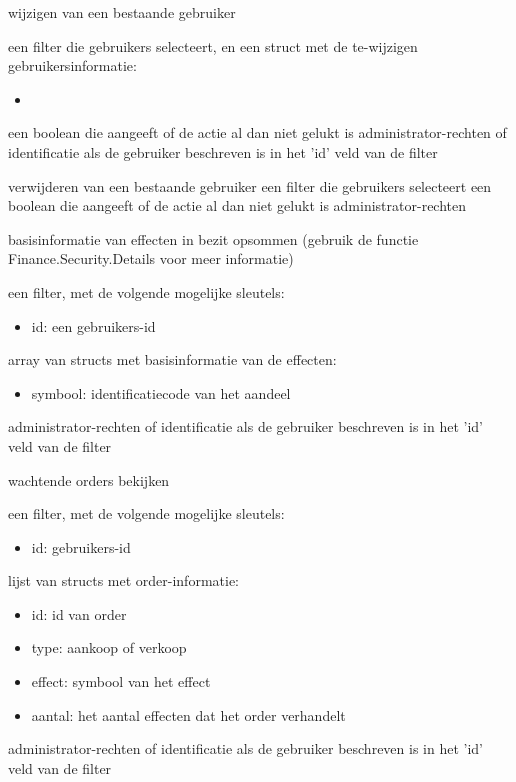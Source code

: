 	{ wijzigen van een bestaande gebruiker }
	{ een filter die gebruikers selecteert, en een struct met de te-wijzigen gebruikersinformatie:
		\begin{itemize}
		\item{}
		\end{itemize} }
	{ een boolean die aangeeft of de actie al dan niet gelukt is }
	{ administrator-rechten of identificatie als de gebruiker beschreven is in het 'id' veld van de filter }

	{ verwijderen van een bestaande gebruiker }
	{ een filter die gebruikers selecteert }
	{ een boolean die aangeeft of de actie al dan niet gelukt is }
	{ administrator-rechten }

	{ basisinformatie van effecten in bezit opsommen (gebruik de functie Finance.Security.Details voor meer informatie) }
	{ een filter, met de volgende mogelijke sleutels:
		\begin{itemize}
		\item{id: een gebruikers-id}
		\end{itemize} }
	{ array van structs met basisinformatie van de effecten:
		\begin{itemize}
		\item{symbool: identificatiecode van het aandeel}
		\end{itemize} }
	{ administrator-rechten of identificatie als de gebruiker beschreven is in het 'id' veld van de filter }

	{ wachtende orders bekijken }
	{ een filter, met de volgende mogelijke sleutels:
		\begin{itemize}
		\item{id: gebruikers-id}
		\end{itemize} }
	{ lijst van structs met order-informatie:
		\begin{itemize}
		\item{id: id van order}
		\item{type: aankoop of verkoop}
		\item{effect: symbool van het effect}
		\item{aantal: het aantal effecten dat het order verhandelt}
		\end{itemize} }
	{ administrator-rechten of identificatie als de gebruiker beschreven is in het 'id' veld van de filter }

